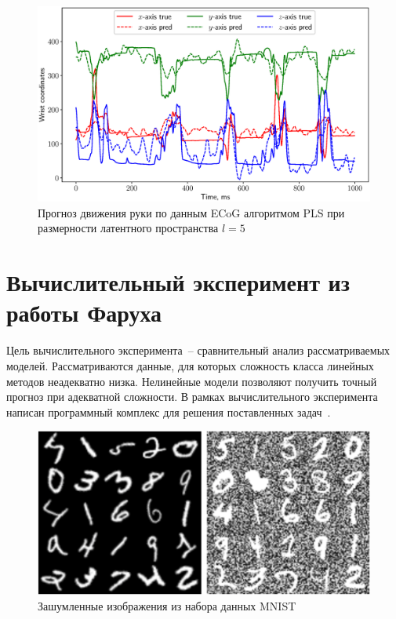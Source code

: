 \begin{figure}[ht]
	\centering
	\includegraphics[width=\textwidth]{figs/ch1/ecog_prediction}
	\caption{Прогноз движения руки по данным ECoG алгоритмом PLS при размерности латентного пространства $l=5$}
	\label{ch1:fig:ecog_prediction}
\end{figure}

\section{Вычислительный эксперимент из работы Фаруха}
Цель вычислительного эксперимента~-- сравнительный анализ рассматриваемых моделей.
Рассматриваются данные, для которых сложность класса линейных методов неадекватно низка.
Нелинейные модели позволяют получить точный прогноз при адекватной сложности.
В рамках вычислительного эксперимента написан программный комплекс для решения поставленных задач~\cite{source_code}.

\begin{figure}[!tp]
\centering 
\includegraphics[width=\linewidth]{figs/ch2/noisy_mnist}
\caption{Зашумленные изображения из набора данных MNIST}
\label{fgr:1}
\end{figure}


